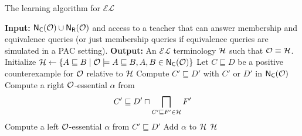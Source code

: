 \begin{algorithm}
\caption{The learning algorithm for $\mathcal{EL}$~\cite{DBLP:conf/kr/DuarteKO18}}
\label{alg:learn}
\begin{algorithmic}[1]
\State \textbf{Input:} ${\sf N_C}(\mathcal{O}) \cup {\sf N_R}(\mathcal{O})$ and access to a teacher that can answer membership and equivalence queries (or just membership queries if equivalence queries are simulated in a PAC setting).
\State \textbf{Output:} An $\mathcal{EL}$ terminology $\mathcal{H}$ such that $\mathcal{O} \equiv \mathcal{H}$.
\Statex
\State Initialize $\mathcal{H} \gets \{A \sqsubseteq B \mid \mathcal{O} \models A \sqsubseteq B, A,B\in {\sf N_C}(\mathcal{O})\}$
\While{$\Hmc \not\equiv \Omc$} \label{line:while}
    \State Let $C \sqsubseteq D$ be a positive counterexample for $\mathcal{O}$ relative to $\mathcal{H}$
    \State Compute $C' \sqsubseteq D'$ with $C'$ or $D'$ in ${\sf N_C}(\mathcal{O})$
    \label{line:counterexample}
        \State Compute a right $\mathcal{O}$-essential $\alpha$ from
        \[
        C' \sqsubseteq D' \sqcap \bigsqcap_{C' \sqsubseteq F' \in \mathcal{H}} F'
        \]
        \label{line:right-essential}
    \Else
        \State Compute a left $\mathcal{O}$-essential $\alpha$ from $C' \sqsubseteq D'$
        \label{line:left-essential}
    \EndIf
    \State Add $\alpha$ to $\mathcal{H}$
    \label{line:add-to-hypothesis}
\EndWhile
\State \Return $\mathcal{H}$
\end{algorithmic}
\end{algorithm}